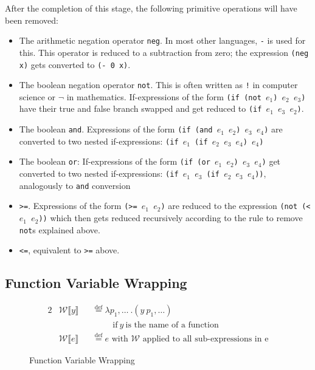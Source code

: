 \documentclass[11pt]{report}
\newcommand{\eqdef}{\stackrel{\text{def}}{=}}%
\begin{document}
After the completion of this stage, the following primitive operations will have been removed: 
\begin{itemize}
\item The arithmetic negation operator \texttt{neg}. In most other languages, \texttt{-} is used for this. This operator is reduced to a subtraction from zero; the expression \texttt{(neg x)} gets converted to \texttt{(- 0 x)}.
\item The boolean negation operator \texttt{not}. This is often written as \texttt{!} in computer science or $\neg$ in mathematics. If-expressions of the form \texttt{(if (not $e_1$) $e_2$ $e_3$)} have their true and false branch swapped and get reduced to \texttt{(if $e_1$ $e_3$ $e_2$)}.
\item The boolean \texttt{and}. Expressions of the form \texttt{(if (and $e_1$ $e_2$) $e_3$ $e_4$)} are converted to two nested if-expressions: \texttt{(if $e_1$ (if $e_2$ $e_3$ $e_4$) $e_4$)}
\item The boolean \texttt{or}: If-expressions of the form \texttt{(if (or $e_1$ $e_2$) $e_3$ $e_4$)} get converted to two nested if-expressions: \texttt{(if $e_1$ $e_3$ (if $e_2$ $e_3$ $e_4$))}, analogously to \texttt{and} conversion
\item \texttt{>=}. Expressions of the form \texttt{(>= $e_1$ $e_2$)} are reduced to the expression \texttt{(not (< $e_1$ $e_2$))} which then gets reduced recursively according to the rule to remove \texttt{not}s explained above.
\item \texttt{<=}, equivalent to \texttt{>=} above.
\end{itemize}

\subsection{Function Variable Wrapping}
\begin{figure}[ht]
\begin{alignat*}{2}
&\mathcal{W}\llbracket y \rrbracket && \eqdef \lambda p_1,\dots~.(y~p_1,\dots)\\
&&&\hspace{1cm}\text{if}~y~\text{is the name of a function}\\
&\mathcal{W}\llbracket e \rrbracket && \eqdef e\text{ with $\mathcal{W}$ applied to all sub-expressions in e}
\end{alignat*}
\caption{Function Variable Wrapping}
\label{fvarwrapping}
\end{figure}
\end{document}
